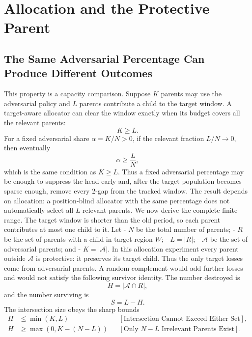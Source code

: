 \section{Allocation and the Protective Parent}
\subsection{The Same Adversarial Percentage Can Produce Different Outcomes}
This property is a capacity comparison. Suppose $K$ parents may use the adversarial policy and $L$ parents contribute a child to the target window. A target-aware allocator can clear the window exactly when its budget covers all the relevant parents:
\begin{equation*}
K\ge L.
\end{equation*}
For a fixed adversarial share $\alpha=K/N>0$, if the relevant fraction $L/N\longrightarrow0$, then eventually
\begin{equation*}
\alpha\ge\frac LN,
\end{equation*}
which is the same condition as $K\ge L$. Thus a fixed adversarial percentage may be enough to suppress the head early and, after the target population becomes sparse enough, remove every 2-gap from the tracked window. The result depends on allocation: a position-blind allocator with the same percentage does not automatically select all $L$ relevant parents.
We now derive the complete finite range. The target window is shorter than the old period, so each parent contributes at most one child to it. Let
- $N$ be the total number of parents; - $R$ be the set of parents with a child in target region $W$; - $L=|R|$; - $\mathcal A$ be the set of adversarial parents; and - $K=|\mathcal A|$.
In this allocation experiment every parent outside $\mathcal A$ is protective: it preserves its target child. Thus the only target losses come from adversarial parents. A random complement would add further losses and would not satisfy the following survivor identity. The number destroyed is
\begin{equation*}
H=|\mathcal A\cap R|,
\end{equation*}
and the number surviving is
\begin{equation*}
S=L-H.
\end{equation*}
The intersection size obeys the sharp bounds
\begin{equation*}
\begin{aligned}
H
&\le\min(K,L)
&&[\text{Intersection Cannot Exceed Either Set}],\\
H
&\ge\max(0,K-(N-L))
&&[\text{Only }N-L\text{ Irrelevant Parents Exist}].
\end{aligned}
\end{equation*}
